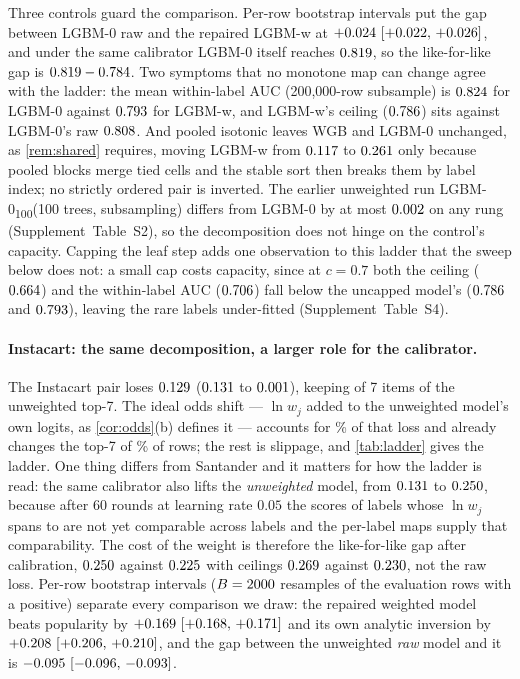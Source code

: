 \documentclass[sigconf,nonacm]{acmart}
\newcommand{\Sm}{\textsf{LGBM-w}\xspace}
\newcommand{\Wm}{\textsf{WGB}\xspace}
\newcommand{\Nm}{\textsf{LGBM-0}\xspace}
\newcommand{\Nhm}{\textsf{LGBM-0\textsubscript{100}}\xspace}
\newcommand{\Supp}[1]{Supplement~#1}  %
\begin{document}
Three controls guard the comparison. Per-row bootstrap intervals put the gap between \Nm raw and the repaired \Sm at $+0.024~[+0.022,\,+0.026]$, and under the same calibrator \Nm itself reaches $0.819$, so the like-for-like gap is $0.819-0.784$. Two symptoms that no monotone map can change agree with the ladder: the mean within-label AUC (200{,}000-row subsample) is $0.824$ for \Nm against $0.793$ for \Sm, and \Sm's ceiling ($0.786$) sits against \Nm's raw $0.808$. And pooled isotonic leaves \Wm and \Nm unchanged, as \cref{rem:shared} requires, moving \Sm from $0.117$ to $0.261$ only because pooled blocks merge tied cells and the stable sort then breaks them by label index; no strictly ordered pair is inverted. The earlier unweighted run \Nhm (100 trees, subsampling) differs from \Nm by at most $0.002$ on any rung (\Supp{Table~S2}), so the decomposition does not hinge on the control's capacity. Capping the leaf step adds one observation to this ladder that the sweep below does not: a small cap costs capacity, since at $c=0.7$ both the ceiling ($0.664$) and the within-label AUC ($0.706$) fall below the uncapped model's ($0.786$ and $0.793$), leaving the rare labels under-fitted (\Supp{Table~S4}).

\paragraph{Instacart: the same decomposition, a larger role for the calibrator.} The Instacart pair loses $0.129$ ($0.131$ to $0.001$), keeping \nIoverlapS{} of 7 items of the unweighted top-7. The ideal odds shift --- $\ln w_j$ added to the unweighted model's own logits, as \cref{cor:odds}(b) defines it --- accounts for \nIoddsShare\% of that loss and already changes the top-7 of \nIfracRowsChangedWhatif\% of rows; the rest is slippage, and \cref{tab:ladder} gives the ladder. One thing differs from Santander and it matters for how the ladder is read: the same calibrator also lifts the \emph{unweighted} model, from $0.131$ to $0.250$, because after 60 rounds at learning rate $0.05$ the scores of \nInLabels{} labels whose $\ln w_j$ spans \nIlnwMin{} to \nIlnwMax{} are not yet comparable across labels and the per-label maps supply that comparability. The cost of the weight is therefore the like-for-like gap after calibration, $0.250$ against $0.225$ with ceilings $0.269$ against $0.230$, not the raw loss. Per-row bootstrap intervals ($B=2000$ resamples of the \nIbootN{} evaluation rows with a positive) separate every comparison we draw: the repaired weighted model beats popularity by $+0.169~[+0.168,\,+0.171]$ and its own analytic inversion by $+0.208~[+0.206,\,+0.210]$, and the gap between the unweighted \emph{raw} model and it is $-0.095~[-0.096,\,-0.093]$.
\end{document}
